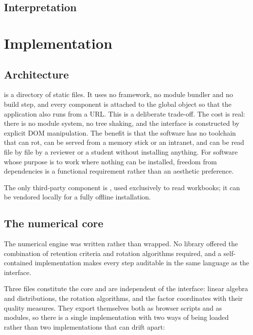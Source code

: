\documentclass[article]{jss}
\begin{document}
\subsection{Interpretation}

\section{Implementation} \label{sec:implementation}

\subsection{Architecture}

 is a directory of static files. It uses no framework, no module
bundler and no build step, and every component is attached to the global object so
that the application also runs from a  URL. This is a deliberate
trade-off. The cost is real: there is no module system, no tree shaking, and the
interface is constructed by explicit DOM manipulation. The benefit is that the
software has no toolchain that can rot, can be served from a memory stick or an
intranet, and can be read file by file by a reviewer or a student without
installing anything. For software whose purpose is to work where nothing can be
installed, freedom from dependencies is a functional requirement rather than an
aesthetic preference.

The only third-party component is , used exclusively to read
 workbooks; it can be vendored locally for a fully offline
installation.

\subsection{The numerical core}

The numerical engine was written rather than wrapped. No 
library offered the combination of retention criteria and rotation algorithms
required, and a self-contained implementation makes every step auditable in the
same language as the interface.

Three files constitute the core and are independent of the interface: linear
algebra and distributions, the rotation algorithms, and the factor coordinates
with their quality measures. They export themselves both as browser scripts and as
 modules, so there is a single implementation with two ways of
being loaded rather than two implementations that can drift apart:
\end{document}
